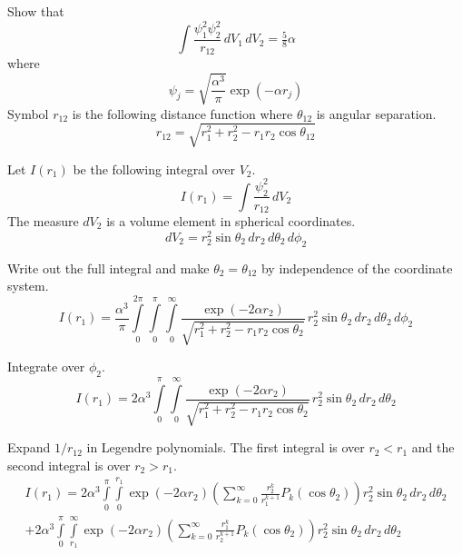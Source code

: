 \documentclass[12pt]{article}
\begin{document}
\noindent
Show that
\begin{equation*}
\int\frac{\psi_1^2\psi_2^2}{r_{12}}\,dV_1\,dV_2=\tfrac{5}{8}\alpha
\end{equation*}
where
\begin{equation*}
\psi_j=\sqrt{\frac{\alpha^3}{\pi}}\exp(-\alpha r_j)
\end{equation*}
Symbol $r_{12}$ is the following distance function where $\theta_{12}$ is angular separation.
\begin{equation*}
r_{12}=\sqrt{r_1^2+r_2^2-r_1r_2\cos\theta_{12}}
\end{equation*}

\noindent
Let $I(r_1)$ be the following integral over $V_2$.
\begin{equation*}
I(r_1)=\int\frac{\psi_2^2}{r_{12}}\,dV_2
\end{equation*}
The measure $dV_2$ is a volume element in spherical coordinates.
\begin{equation*}
dV_2=r_2^2\sin\theta_2\,dr_2\,d\theta_2\,d\phi_2
\end{equation*}

\noindent
Write out the full integral and make $\theta_2=\theta_{12}$ by independence of the coordinate system.
\begin{equation*}
I(r_1)=\frac{\alpha^3}{\pi}
\int\limits_0^{2\pi}\int\limits_0^\pi\int\limits_0^\infty
\frac{\exp(-2\alpha r_2)}{\sqrt{r_1^2+r_2^2-r_1r_2\cos\theta_2}}
\,r_2^2\sin\theta_2\,dr_2\,d\theta_2\,d\phi_2
\end{equation*}

\noindent
Integrate over $\phi_2$.
\begin{equation*}
I(r_1)=
2\alpha^3\int\limits_0^\pi\int\limits_0^\infty
\frac{\exp(-2\alpha r_2)}{\sqrt{r_1^2+r_2^2-r_1r_2\cos\theta_2}}
\,r_2^2\sin\theta_2\,dr_2\,d\theta_2
\end{equation*}

\noindent
Expand $1/r_{12}$ in Legendre polynomials.
The first integral is over $r_2<r_1$ and the second integral is over $r_2>r_1$.
\begin{multline*}
I(r_1)=
2\alpha^3\int\limits_0^\pi\int\limits_0^{r_1}
\exp(-2\alpha r_2)
\left(\sum_{k=0}^\infty\frac{r_2^k}{r_1^{k+1}}P_k(\cos\theta_2)\right)
r_2^2\sin\theta_2\,dr_2\,d\theta_2
\\
+2\alpha^3\int\limits_0^\pi\int\limits_{r_1}^\infty
\exp(-2\alpha r_2)
\left(\sum_{k=0}^\infty\frac{r_1^k}{r_2^{k+1}}P_k(\cos\theta_2)\right)
r_2^2\sin\theta_2\,dr_2\,d\theta_2
\end{multline*}
\end{document}
